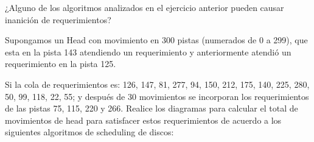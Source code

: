 \begin{questions}

\question ¿Alguno de los algoritmos analizados en el ejercicio anterior pueden causar inanición de requerimientos?

\question Supongamos un Head con movimiento en 300 pistas (numerados de 0 a 299), que esta en la
pista 143 atendiendo un requerimiento y anteriormente atendió un requerimiento en la pista 125.

\hspace{20pt} Si la cola de requerimientos es: 126, 147, 81, 277, 94, 150, 212, 175, 140, 225, 280, 50, 99, 118, 22, 55; y después de 30 movimientos se incorporan los requerimientos de las pistas 75, 115, 220 y 266. Realice los diagramas para calcular el total de movimientos de head para satisfacer estos requerimientos de acuerdo a los siguientes algoritmos de scheduling de discos:


\end{questions}
